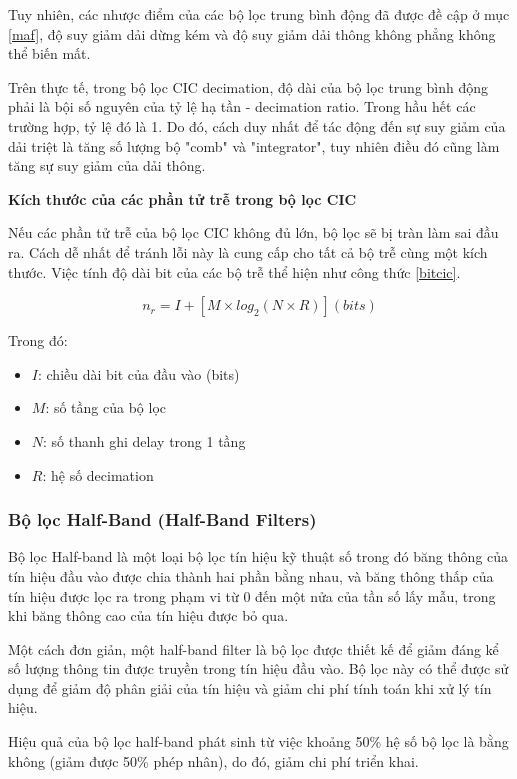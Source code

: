 Tuy nhiên, các nhược điểm của các bộ lọc trung bình động đã được đề cập ở mục \ref{maf}, độ suy giảm dải dừng kém và độ suy giảm dải thông không phẳng không thể biến mất.

Trên thực tế, trong bộ lọc CIC decimation, độ dài của bộ lọc trung bình động phải là bội số nguyên của tỷ lệ hạ tần - decimation ratio. Trong hầu hết các trường hợp, tỷ lệ đó là 1. Do đó, cách duy nhất để tác động đến sự suy giảm của dải triệt là tăng số lượng bộ "comb" và "integrator", tuy nhiên điều đó cũng làm tăng sự suy giảm của dải thông.

\textbf{Kích thước của các phần tử trễ trong bộ lọc CIC}

Nếu các phần tử trễ của bộ lọc CIC không đủ lớn, bộ lọc sẽ bị tràn làm sai đầu ra. Cách dễ nhất để tránh lỗi này là cung cấp cho tất cả bộ trễ cùng một kích thước. Việc tính độ dài bit của các bộ trễ thể hiện như công thức \ref{bitcic}.

\begin{equation} \label{bitcic}
    n_r = I + [M \times log_2(N \times R)] (bits)
\end{equation}

Trong đó:
\begin{itemize}
    \item $I$: chiều dài bit của đầu vào (bits)
    \item $M$: số tầng của bộ lọc
    \item $N$: số thanh ghi delay trong 1 tầng
    \item $R$: hệ số decimation
\end{itemize}
\subsubsection{Bộ lọc Half-Band (Half-Band Filters)}
Bộ lọc Half-band là một loại bộ lọc tín hiệu kỹ thuật số trong đó băng thông của tín hiệu đầu vào được chia thành hai phần bằng nhau, và băng thông thấp của tín hiệu được lọc ra trong phạm vi từ 0 đến một nửa của tần số lấy mẫu, trong khi băng thông cao của tín hiệu được bỏ qua.

Một cách đơn giản, một half-band filter là bộ lọc được thiết kế để giảm đáng kể số lượng thông tin được truyền trong tín hiệu đầu vào. Bộ lọc này có thể được sử dụng để giảm độ phân giải của tín hiệu và giảm chi phí tính toán khi xử lý tín hiệu.

 Hiệu quả của bộ lọc half-band phát sinh từ việc khoảng 50\% hệ số bộ lọc là bằng không (giảm được 50\% phép nhân), do đó, giảm chi phí triển khai. \cite{half_band}

